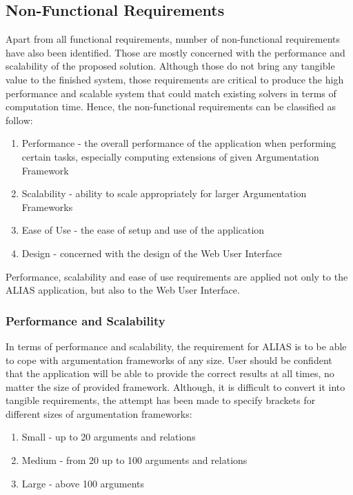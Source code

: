 \subsection{Non-Functional Requirements}
Apart from all functional requirements, number of non-functional requirements have also been identified. Those are mostly concerned with the performance and scalability of the proposed solution. Although those do not bring any tangible value to the finished system, those requirements are critical to produce the high performance and scalable system that could match existing solvers in terms of computation time. Hence, the non-functional requirements can be classified as follow:

\begin{enumerate}
	\item Performance - the overall performance of the application when performing certain tasks, especially computing extensions of given Argumentation Framework
	\item Scalability - ability to scale appropriately for larger Argumentation Frameworks
	\item Ease of Use - the ease of setup and use of the application 
	\item Design - concerned with the design of the Web User Interface
\end{enumerate}

Performance, scalability and ease of use requirements are applied not only to the ALIAS application, but also to the Web User Interface. 

\subsubsection{Performance and Scalability}

In terms of performance and scalability, the requirement for ALIAS is to be able to cope with argumentation frameworks of any size. User should be confident that the application will be able to provide the correct results at all times, no matter the size of provided framework. Although, it is difficult to convert it into tangible requirements, the attempt has been made to specify brackets for different sizes of argumentation frameworks: 

\begin{enumerate}
	\item Small - up to 20 arguments and relations
	\item Medium - from 20 up to 100 arguments and relations
	\item Large - above 100 arguments 
\end{enumerate}


